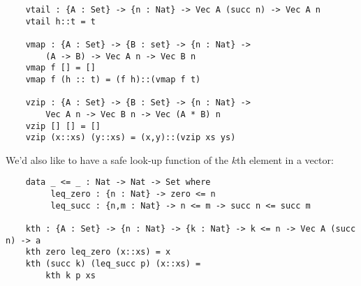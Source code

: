 \documentclass[11pt]{article}
\begin{document}
\begin{verbatim}
    vtail : {A : Set} -> {n : Nat} -> Vec A (succ n) -> Vec A n
    vtail h::t = t

    vmap : {A : Set} -> {B : set} -> {n : Nat} ->
        (A -> B) -> Vec A n -> Vec B n
    vmap f [] = []
    vmap f (h :: t) = (f h)::(vmap f t)

    vzip : {A : Set} -> {B : Set} -> {n : Nat} ->
        Vec A n -> Vec B n -> Vec (A * B) n
    vzip [] [] = []
    vzip (x::xs) (y::xs) = (x,y)::(vzip xs ys)
\end{verbatim}

We'd also like to have a safe look-up function of the $k$th element in a vector:
\begin{verbatim}
    data _ <= _ : Nat -> Nat -> Set where
         leq_zero : {n : Nat} -> zero <= n
         leq_succ : {n,m : Nat} -> n <= m -> succ n <= succ m

    kth : {A : Set} -> {n : Nat} -> {k : Nat} -> k <= n -> Vec A (succ n) -> a
    kth zero leq_zero (x::xs) = x
    kth (succ k) (leq_succ p) (x::xs) = 
        kth k p xs
\end{verbatim}
\end{document}
